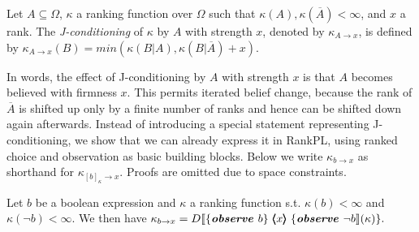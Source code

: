\documentclass{llncs}
\newcommand{\mods}[2]{[#2]_{#1}}
\newcommand{\dn}[1]{D\llbracket #1 \rrbracket}
\newcommand{\Rank}[1]{\hspace{3pt} \pmb{\langle} #1 \pmb{\rangle}\hspace{3pt} } %
\begin{document}
\begin{definition}\label{defn:resultoriented}
Let $A \subseteq \Omega$, $\kappa$ a ranking function over $\Omega$ such that $\kappa(A), \kappa(\overline A) < \infty$, and $x$ a rank.
The \emph{J-conditioning} of $\kappa$ by $A$ with strength $x$, denoted by $\kappa_{A \rightarrow x}$, is defined by
	$\kappa_{A \rightarrow x}(B) = min ( \kappa(B | A), \kappa(B | \overline A) + x ).$ %
\end{definition}

In words, the effect of J-conditioning by $A$ with strength $x$ is that $A$ becomes believed with firmness $x$.
This permits iterated belief change, because the rank of $\overline A$ is shifted up only by a finite number of ranks
	and hence can be shifted down again afterwards. %
Instead of introducing a special statement representing J-conditioning, we show that we can already express it in RankPL, 
	using ranked choice and observation as basic building blocks.
Below we write $\kappa_{b \rightarrow x}$ as shorthand for $\kappa_{\mods{\kappa}{b} \rightarrow x}$.
Proofs are omitted due to space constraints.
\begin{theorem}
Let $b$ be a boolean expression and $\kappa$ a ranking function s.t. $\kappa(b) < \infty$ and $\kappa(\neg b) < \infty$.
We then have
$\kappa_{b \rightarrow x} = \dn{\{\emph{\textbf{observe }}b \}\Rank{x} \{\emph{\textbf{observe }}\neg b}(\kappa)\}.$ 
\end{theorem}
\end{document}
